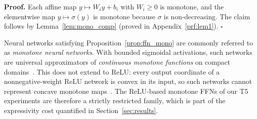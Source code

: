 \documentclass{article}
\theoremstyle{plain}
\newtheorem{proposition}[theorem]{Proposition}
\theoremstyle{definition}
\newtheorem{definition}[theorem]{Definition}
\theoremstyle{remark}
\begin{document}

\textbf{Proof.} Each affine map $y \mapsto W_i y + b_i$ with $W_i \ge 0$ is monotone, and the elementwise map $y \mapsto \sigma(y)$ is monotone because $\sigma$ is non-decreasing. The claim follows by Lemma~\ref{lem:mono_comp} (proved in Appendix~\ref{prf:lem1}). \hfill $\square$

Neural networks satisfying Proposition~\ref{prop:ffn_mono} are commonly referred to as \emph{monotone neural networks}. With bounded sigmoidal activations, such networks are universal approximators of \emph{continuous monotone functions} on compact domains~\citep{Daniels2010Monotone}. This does not extend to ReLU: every output coordinate of a nonnegative-weight ReLU network is convex in its input, so such networks cannot represent concave monotone maps~\citep{runje2023constrained}. The ReLU-based monotone FFNs of our T5 experiments are therefore a strictly restricted family, which is part of the expressivity cost quantified in Section~\ref{sec:results}.


\end{document}
